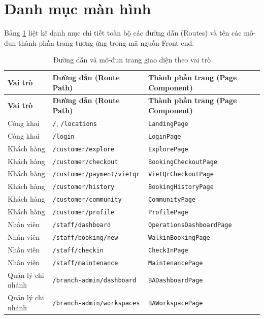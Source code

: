 \section{Danh mục màn hình}
\label{sec:gd_danhmuc}

Bảng \ref{tab:gd_danhmuc} liệt kê danh mục chi tiết toàn bộ các đường dẫn (Routes) và tên các mô-đun thành phần trang tương ứng trong mã nguồn Front-end.

{\footnotesize
\begin{longtable}{|p{2.6cm}|p{5.4cm}|p{5.4cm}|}
\caption{Đường dẫn và mô-đun trang giao diện theo vai trò}\label{tab:gd_danhmuc}\\
\hline
\textbf{Vai trò} & \textbf{Đường dẫn (Route Path)} & \textbf{Thành phần trang (Page Component)} \\
\hline
\endfirsthead
\hline
\textbf{Vai trò} & \textbf{Đường dẫn (Route Path)} & \textbf{Thành phần trang (Page Component)} \\
\hline
\endhead
Công khai & \texttt{/}, \texttt{/locations} & \texttt{LandingPage} \\
\hline
Công khai & \texttt{/login} & \texttt{LoginPage} \\
\hline
Khách hàng & \texttt{/customer/explore} & \texttt{ExplorePage} \\
\hline
Khách hàng & \texttt{/customer/checkout} & \texttt{BookingCheckoutPage} \\
\hline
Khách hàng & \texttt{/customer/payment/vietqr} & \texttt{VietQrCheckoutPage} \\
\hline
Khách hàng & \texttt{/customer/history} & \texttt{BookingHistoryPage} \\
\hline
Khách hàng & \texttt{/customer/community} & \texttt{CommunityPage} \\
\hline
Khách hàng & \texttt{/customer/profile} & \texttt{ProfilePage} \\
\hline
Nhân viên & \texttt{/staff/dashboard} & \texttt{OperationsDashboardPage} \\
\hline
Nhân viên & \texttt{/staff/booking/new} & \texttt{WalkinBookingPage} \\
\hline
Nhân viên & \texttt{/staff/checkin} & \texttt{CheckInPage} \\
\hline
Nhân viên & \texttt{/staff/maintenance} & \texttt{MaintenancePage} \\
\hline
Quản lý chi nhánh & \texttt{/branch-admin/dashboard} & \texttt{BADashboardPage} \\
\hline
Quản lý chi nhánh & \texttt{/branch-admin/workspaces} & \texttt{BAWorkspacePage} \\

\end{longtable}}
